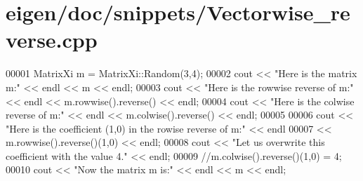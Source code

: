 \hypertarget{eigen_2doc_2snippets_2_vectorwise__reverse_8cpp_source}{}\section{eigen/doc/snippets/\+Vectorwise\+\_\+reverse.cpp}
\label{eigen_2doc_2snippets_2_vectorwise__reverse_8cpp_source}

\begin{DoxyCode}
00001 MatrixXi m = MatrixXi::Random(3,4);
00002 cout << \textcolor{stringliteral}{"Here is the matrix m:"} << endl << m << endl;
00003 cout << \textcolor{stringliteral}{"Here is the rowwise reverse of m:"} << endl << m.rowwise().reverse() << endl;
00004 cout << \textcolor{stringliteral}{"Here is the colwise reverse of m:"} << endl << m.colwise().reverse() << endl;
00005 
00006 cout << \textcolor{stringliteral}{"Here is the coefficient (1,0) in the rowise reverse of m:"} << endl
00007 << m.rowwise().reverse()(1,0) << endl;
00008 cout << \textcolor{stringliteral}{"Let us overwrite this coefficient with the value 4."} << endl;
00009 \textcolor{comment}{//m.colwise().reverse()(1,0) = 4;}
00010 cout << \textcolor{stringliteral}{"Now the matrix m is:"} << endl << m << endl;
\end{DoxyCode}
